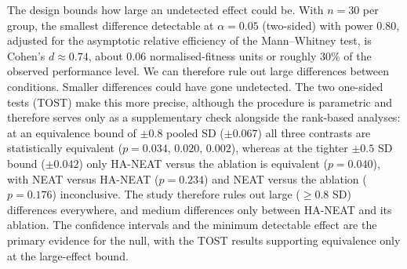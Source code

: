 \documentclass[12pt]{article}
\newcommand{\revAcro}[2]{#2}
\begin{document}
The design bounds how large an undetected effect could be.
With $n = 30$ per group, the smallest difference detectable at $\alpha = 0.05$ (two-sided) with power 0.80, adjusted for the asymptotic relative efficiency of the Mann--Whitney test, is Cohen's $d \approx 0.74$, about 0.06 normalised-fitness units or roughly 30\% of the observed performance level.
We can therefore rule out large differences between conditions. Smaller differences could have gone undetected.
\revAcro{A-03}{The two one-sided tests (TOST)} make this more precise, although the procedure is parametric and therefore serves only as a supplementary check alongside the rank-based analyses: at an equivalence bound of $\pm 0.8$ pooled SD ($\pm 0.067$) all three contrasts are statistically equivalent ($p = 0.034$, $0.020$, $0.002$), whereas at the tighter $\pm 0.5$ SD bound ($\pm 0.042$) only HA-NEAT versus the ablation is equivalent ($p = 0.040$), with NEAT versus HA-NEAT ($p = 0.234$) and NEAT versus the ablation ($p = 0.176$) inconclusive.
The study therefore rules out large ($\geq 0.8$ SD) differences everywhere, and medium differences only between HA-NEAT and its ablation. The confidence intervals and the minimum detectable effect are the primary evidence for the null, with the TOST results supporting equivalence only at the large-effect bound.
\end{document}
